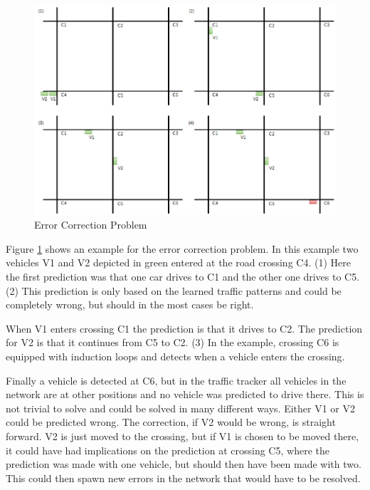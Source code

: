 \begin{figure}[ht]
  \centering
  \includegraphics[width=16cm]{figures/errorCorrectionProblem}
  \caption[Error Correction Problem]{Error Correction Problem \protect\footnotemark}
  \label{errorCorrectionProblem}
\end{figure}


Figure \ref{errorCorrectionProblem} shows an example for the error correction problem. In this example two vehicles V1 and V2 depicted in green entered at the road crossing C4. (1) Here the first prediction was that one car drives to C1 and the other one drives to C5. (2) This prediction is only based on the learned traffic patterns and could be completely wrong, but should in the most cases be right.

When V1 enters crossing C1 the prediction is that it drives to C2. The prediction for V2 is that it continues from C5 to C2. (3) In the example, crossing C6 is equipped with induction loops and detects when a vehicle enters the crossing.

Finally a vehicle is detected at C6, but in the traffic tracker all vehicles in the network are at other positions and no vehicle was predicted to drive there. This is not trivial to solve and could be solved in many different ways. Either V1 or V2 could be predicted wrong. The correction, if V2 would be wrong, is straight forward. V2 is just moved to the crossing, but if V1 is chosen to be moved there, it could have had implications on the prediction at crossing C5, where the prediction was made with one vehicle, but should then have been made with two. This could then spawn new errors in the network that would have to be resolved.

